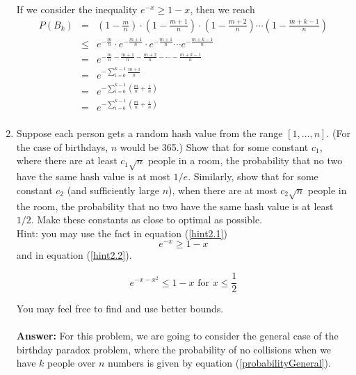 \documentclass[tikz, 12pt]{scrartcl}
\begin{document}
\begin{enumerate}
	If we consider the inequality $e^{-x} \geq 1-x$, then we reach
	\begin{eqnarray}
	P(B_k)	&	=	&	\left(1 - \frac{m}{n} \right) \cdot \left(1 -  \frac{m + 1}{n} \right)\cdot \left(1 -  \frac{m + 2}{n} \right) \cdots \left(1 -  \frac{m + k-1}{n} \right) \nonumber \\
			&	\leq	&	e^{-\frac{m}{n}} \cdot e^{-\frac{m+1}{n}}\cdot e^{-\frac{m+1}{n}} \cdots e^{-\frac{m+k - 1}{n}} \nonumber \\
			&	=	&	e^{-\frac{m}{n}-\frac{m + 1}{n} -\frac{m + 2}{n} - \cdots -\frac{m + k -1}{n}} \nonumber\\
			&	=	&	e^{-\sum_{i=0}^{k - 1}\frac{m + i}{n} }\nonumber \\
			&	=	&	e^{-\sum_{i=0}^{k - 1}\left( \frac{m}{n}  + \frac{i}{n} \right)}  \nonumber \\
			&	=	&	e^{-\sum_{i=0}^{k - 1}\left( \frac{m}{n}  + \frac{i}{n} \right)}  \nonumber \\
	\end{eqnarray}
	
	\item Suppose each person gets a random hash value from the range $[1, \ldots, n]$. (For the case of birthdays, $n$ would be 365.) Show that for some constant $c_1$, where there are at least $c_1 \sqrt{n}$ people in a room, the probability that no two have the same hash value is at most $1/e$. Similarly, show that for some constant $c_2$ (and sufficiently large $n$), when there are at most $c_2 \sqrt{n}$ people in the room, the probability that no two have the same hash value is at least $1/2$. Make these constants as close to optimal as possible.\\
	Hint: you may use the fact in equation (\ref{hint2.1})
	\begin{equation}\label{hint2.1}
		e^{-x} \geq 1 - x
	\end{equation}
	and in equation (\ref{hint2.2}).
	
	\begin{equation}\label{hint2.2}
	e^{-x - x^2} \leq 1 - x \mbox{ for } x \leq \frac{1}{2}
	\end{equation}
	
	You may feel free to find and use better bounds.\\
	\\
	\textbf{Answer: } For this problem, we are going to consider the general case of the birthday paradox problem, where the probability of no collisions when we have $k$ people over $n$ numbers is given by equation (\ref{probabilityGeneral}).
	

\end{enumerate}
\end{document}
